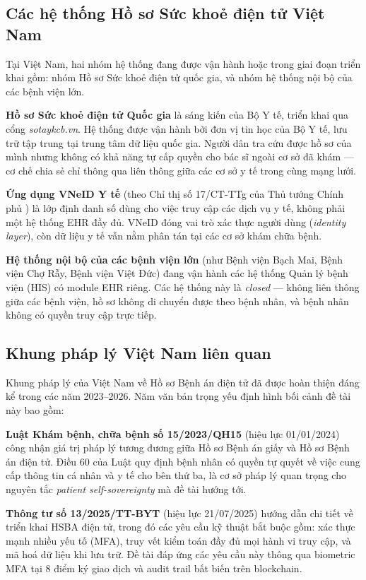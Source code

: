 \documentclass[../DoAn]{subfiles}
\begin{document}
\subsection{Các hệ thống Hồ sơ Sức khoẻ điện tử Việt Nam}

Tại Việt Nam, hai nhóm hệ thống đang được vận hành hoặc trong giai đoạn triển khai gồm: nhóm Hồ sơ Sức khoẻ điện tử quốc gia, và nhóm hệ thống nội bộ của các bệnh viện lớn.

\textbf{Hồ sơ Sức khoẻ điện tử Quốc gia} \cite{hssktdt_vn} là sáng kiến của Bộ Y tế, triển khai qua cổng \textit{sotaykcb.vn}. Hệ thống được vận hành bởi đơn vị tin học của Bộ Y tế, lưu trữ tập trung tại trung tâm dữ liệu quốc gia. Người dân tra cứu được hồ sơ của mình nhưng không có khả năng tự cấp quyền cho bác sĩ ngoài cơ sở đã khám --- cơ chế chia sẻ chỉ thông qua liên thông giữa các cơ sở y tế trong cùng mạng lưới.

\textbf{Ứng dụng VNeID Y tế} (theo Chỉ thị số 17/CT-TTg của Thủ tướng Chính phủ \cite{ct17_ttg}) là lớp định danh số dùng cho việc truy cập các dịch vụ y tế, không phải một hệ thống EHR đầy đủ. VNeID đóng vai trò xác thực người dùng (\textit{identity layer}), còn dữ liệu y tế vẫn nằm phân tán tại các cơ sở khám chữa bệnh.

\textbf{Hệ thống nội bộ của các bệnh viện lớn} (như Bệnh viện Bạch Mai, Bệnh viện Chợ Rẫy, Bệnh viện Việt Đức) đang vận hành các hệ thống Quản lý bệnh viện (HIS) có module EHR riêng. Các hệ thống này là \textit{closed} --- không liên thông giữa các bệnh viện, hồ sơ không di chuyển được theo bệnh nhân, và bệnh nhân không có quyền truy cập trực tiếp.

\subsection{Khung pháp lý Việt Nam liên quan}

Khung pháp lý của Việt Nam về Hồ sơ Bệnh án điện tử đã được hoàn thiện đáng kể trong các năm 2023--2026. Năm văn bản trọng yếu định hình bối cảnh đề tài này bao gồm:

\textbf{Luật Khám bệnh, chữa bệnh số 15/2023/QH15} \cite{luatkcb2023} (hiệu lực 01/01/2024) công nhận giá trị pháp lý tương đương giữa Hồ sơ Bệnh án giấy và Hồ sơ Bệnh án điện tử. Điều 60 của Luật quy định bệnh nhân có quyền tự quyết về việc cung cấp thông tin cá nhân và y tế cho bên thứ ba, là cơ sở pháp lý quan trọng cho nguyên tắc \textit{patient self-sovereignty} mà đề tài hướng tới.

\textbf{Thông tư số 13/2025/TT-BYT} \cite{tt13_2025_byt} (hiệu lực 21/07/2025) hướng dẫn chi tiết về triển khai HSBA điện tử, trong đó các yêu cầu kỹ thuật bắt buộc gồm: xác thực mạnh nhiều yếu tố (MFA), truy vết kiểm toán đầy đủ mọi hành vi truy cập, và mã hoá dữ liệu khi lưu trữ. Đề tài đáp ứng các yêu cầu này thông qua biometric MFA tại 8 điểm ký giao dịch và audit trail bất biến trên blockchain.
\end{document}
